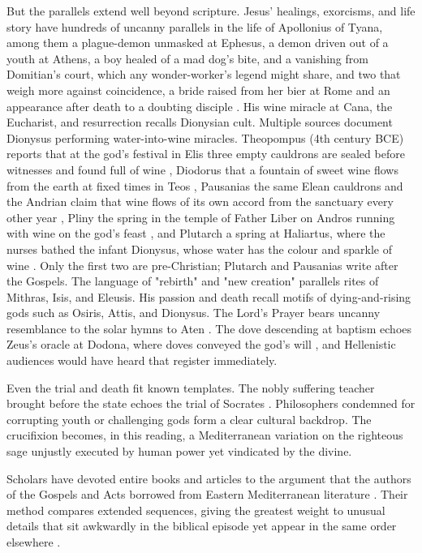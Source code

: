 But the parallels extend well beyond scripture.
Jesus' healings, exorcisms, and life story have hundreds of uncanny parallels in the life of Apollonius of Tyana, among them a plague-demon unmasked at Ephesus, a demon driven out of a youth at Athens, a boy healed of a mad dog's bite, and a vanishing from Domitian's court, which any wonder-worker's legend might share, and two that weigh more against coincidence, a bride raised from her bier at Rome and an appearance after death to a doubting disciple \cite[4.10, 4.20, 4.45, 6.43, 8.5, 8.30--31]{philostratus:apollonius}.
His wine miracle at Cana, the Eucharist, and resurrection recalls Dionysian cult.
Multiple sources document Dionysus performing water-into-wine miracles.
Theopompus (4th century BCE) reports that at the god's festival in Elis three empty cauldrons are sealed before witnesses and found full of wine \cite[1.34a--b]{athenaeus:deipnosophistae}, Diodorus that a fountain of sweet wine flows from the earth at fixed times in Teos \cite[3.66.2]{diodorus:library}, Pausanias the same Elean cauldrons and the Andrian claim that wine flows of its own accord from the sanctuary every other year \cite[6.26.1--2]{pausanias:description}, Pliny the spring in the temple of Father Liber on Andros running with wine on the god's feast \cite[2.231; 31.16]{pliny:nh}, and Plutarch a spring at Haliartus, where the nurses bathed the infant Dionysus, whose water has the colour and sparkle of wine \cite[Lysander 28.4]{plutarch:lives}.
Only the first two are pre-Christian; Plutarch and Pausanias write after the Gospels.
The language of "rebirth" and "new creation" parallels rites of Mithras, Isis, and Eleusis.
His passion and death recall motifs of dying-and-rising gods such as Osiris, Attis, and Dionysus.
The Lord's Prayer bears uncanny resemblance to the solar hymns to Aten \cite{hymn:aten}.
The dove descending at baptism echoes Zeus's oracle at Dodona, where doves conveyed the god's will \cite[2.55--57]{herodotus:histories}, and Hellenistic audiences would have heard that register immediately.

Even the trial and death fit known templates.
The nobly suffering teacher brought before the state echoes the trial of Socrates \cite{plato:apology}.
Philosophers condemned for corrupting youth or challenging gods form a clear cultural backdrop.
The crucifixion becomes, in this reading, a Mediterranean variation on the righteous sage unjustly executed by human power yet vindicated by the divine.

Scholars have devoted entire books and articles to the argument that the authors of the Gospels and Acts borrowed from Eastern Mediterranean literature \cite{macdonald:homeric-mark,macdonald:nt-homer,moles:jesus-dionysus}.
Their method compares extended sequences, giving the greatest weight to unusual details that sit awkwardly in the biblical episode yet appear in the same order elsewhere \cite{macdonald:homeric-mark,macdonald:nt-homer,moles:jesus-dionysus}.

